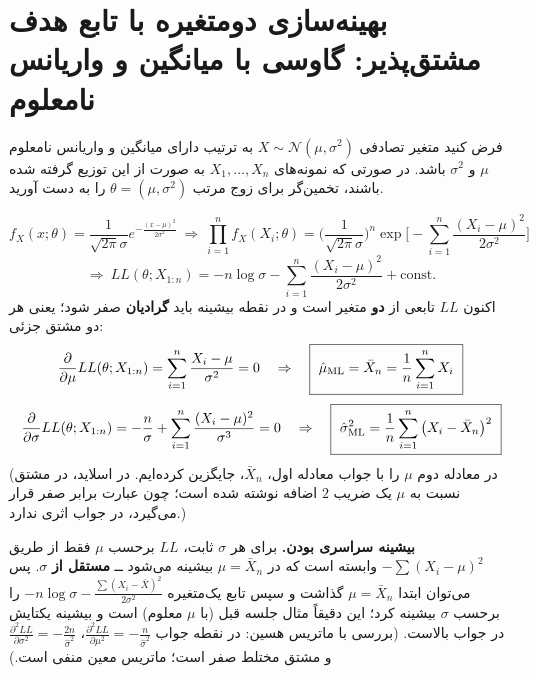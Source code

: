 \section{بهینه‌سازی دومتغیره با تابع هدف مشتق‌پذیر: گاوسی با میانگین و واریانس نامعلوم}

\begin{example}
فرض کنید متغیر تصادفی $X\sim\mathcal N(\mu,\sigma^2)$ به ترتیب دارای میانگین و واریانس نامعلوم $\mu$ و $\sigma^2$ باشد. در صورتی که نمونه‌های $X_1,\ldots,X_n$ به صورت  از این توزیع گرفته شده باشند، تخمین‌گر  برای زوج مرتب $\theta=(\mu,\sigma^2)$ را به دست آورید.
\begin{solution}
\[
f_X(x;\theta)=\frac{1}{\sqrt{2\pi}\sigma}e^{-\frac{(x-\mu)^2}{2\sigma^2}}
\ \Rightarrow\
\prod_{i=1}^nf_X(X_i;\theta)=\Big(\frac{1}{\sqrt{2\pi}\sigma}\Big)^n\exp\Big[-\sum_{i=1}^n\frac{(X_i-\mu)^2}{2\sigma^2}\Big]
\]
\[
\Rightarrow\ LL(\theta;X_{1:n})=-n\log\sigma-\sum_{i=1}^n\frac{(X_i-\mu)^2}{2\sigma^2}+\mathrm{const}.
\]
اکنون $LL$ تابعی از \textbf{دو} متغیر است و در نقطه بیشینه باید \textbf{گرادیان} صفر شود؛ یعنی هر دو مشتق جزئی:
\[
\frac{\partial}{\partial\mu}LL(\theta;X_{1:n})=\sum_{i=1}^n\frac{X_i-\mu}{\sigma^2}=0
\quad\Rightarrow\quad
\boxed{\ \hat\mu_{\mathrm{ML}}=\bar X_n=\frac1n\sum_{i=1}^nX_i\ }
\]
\[
\frac{\partial}{\partial\sigma}LL(\theta;X_{1:n})=-\frac n\sigma+\sum_{i=1}^n\frac{(X_i-\mu)^2}{\sigma^3}=0
\quad\Rightarrow\quad
\boxed{\ \hat\sigma^2_\ML=\frac1n\sum_{i=1}^n\big(X_i-\bar X_n\big)^2\ }
\]
(در معادله دوم $\mu$ را با جواب معادله اول، $\bar X_n$، جایگزین کرده‌ایم. در اسلاید، در مشتق نسبت به $\mu$ یک ضریب $2$ اضافه نوشته شده است؛ چون عبارت برابر صفر قرار می‌گیرد، در جواب اثری ندارد.)

\textbf{بیشینه سراسری بودن.} برای هر $\sigma$ ثابت، $LL$ برحسب $\mu$ فقط از طریق $-\sum(X_i-\mu)^2$ وابسته است که در $\mu=\bar X_n$ بیشینه می‌شود ــ \textbf{مستقل از} $\sigma$. پس می‌توان ابتدا $\mu=\bar X_n$ گذاشت و سپس تابع یک‌متغیره $-n\log\sigma-\frac{\sum(X_i-\bar X)^2}{2\sigma^2}$ را برحسب $\sigma$ بیشینه کرد؛ این دقیقاً مثال جلسه قبل (با $\mu$ معلوم) است و بیشینه یکتایش در جواب بالاست. (بررسی با ماتریس هسین: در نقطه جواب $\frac{\partial^2LL}{\partial\mu^2}=-\frac{n}{\hat\sigma^2}$، $\frac{\partial^2LL}{\partial\sigma^2}=-\frac{2n}{\hat\sigma^2}$ و مشتق مختلط صفر است؛ ماتریس معین منفی است.)
\end{solution}
\end{example}

